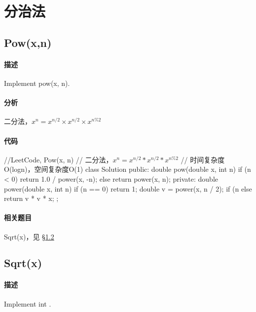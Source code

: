 \chapter{分治法}


\section{Pow(x,n)} %
\label{sec:pow}


\subsubsection{描述}
Implement pow(x, n).


\subsubsection{分析}
二分法，$x^n = x^{n/2} \times x^{n/2} \times x^{n\%2}$


\subsubsection{代码}
\begin{Code}
//LeetCode, Pow(x, n)
// 二分法，$x^n = x^{n/2} * x^{n/2} * x^{n\%2}$
// 时间复杂度O(logn)，空间复杂度O(1)
class Solution {
public:
    double pow(double x, int n) {
        if (n < 0) return 1.0 / power(x, -n);
        else return power(x, n);
    }
private:
    double power(double x, int n) {
        if (n == 0) return 1;
        double v = power(x, n / 2);
        if (n %
        else return v * v * x;
    }
};
\end{Code}


\subsubsection{相关题目}

\begindot
\item Sqrt(x)，见 \S \ref{sec:sqrt}
\myenddot


\section{Sqrt(x)} %
\label{sec:sqrt}

\subsubsection{描述}
Implement int .

